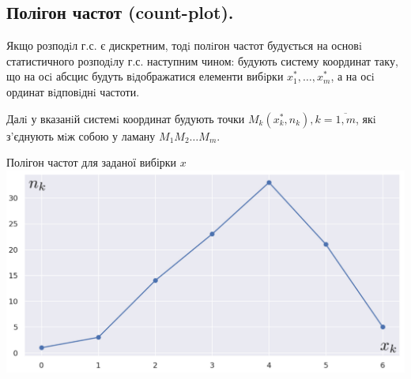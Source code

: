 \documentclass[14pt,a4paper]{scrartcl}
\theoremstyle{definition}
\theoremstyle{remark}
\theoremstyle{definition}
\theoremstyle{definition}
\begin{document}
\subsection*{Полігон частот (count-plot).}
Якщо розподiл г.с. є дискретним, тодi полiгон частот будується на основi статистичного
розподiлу г.с. наступним чином: будують систему координат таку, що на осi абсцис будуть вiдображатися елементи вибiрки $x_1^*, \dots , x_m^*$, а на осi ординат вiдповiднi частоти.\par Далi у вказанiй системi координат будують точки $M_k (x_k^*, n_k), k= \overline{1,m}$, якi з’єднують
мiж собою у ламану $M_1M_2\dots M_m$.
\begin{center}
Полігон частот для заданої вибірки $x$
 \includegraphics[scale=0.35]{assets/РР_126_Терещенко-d875be8e.png}
\end{center}
\end{document}
